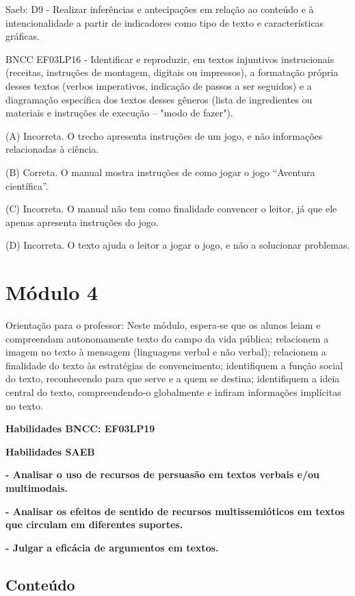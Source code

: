Saeb: D9 - Realizar inferências e antecipações em relação ao conteúdo e
à intencionalidade a partir de indicadores como tipo de texto e
características gráficas.

BNCC EF03LP16 - Identificar e reproduzir, em textos injuntivos
instrucionais (receitas, instruções de montagem, digitais ou impressos),
a formatação própria desses textos (verbos imperativos, indicação de
passos a ser seguidos) e a diagramação específica dos textos desses
gêneros (lista de ingredientes ou materiais e instruções de execução --
"modo de fazer").

(A) Incorreta. O trecho apresenta instruções de um jogo, e não
informações relacionadas à ciência.

(B) Correta. O manual mostra instruções de como jogar o jogo ``Aventura
científica''.

(C) Incorreta. O manual não tem como finalidade convencer o leitor, já
que ele apenas apresenta instruções do jogo.

(D) Incorreta. O texto ajuda o leitor a jogar o jogo, e não a solucionar
problemas.

\section{Módulo 4}\label{muxf3dulo-4}

Orientação para o professor: Neste módulo, espera-se que os alunos leiam
e compreendam autonomamente texto do campo da vida pública; relacionem a
imagem no texto à mensagem (linguagens verbal e não verbal); relacionem
a finalidade do texto às estratégias de convencimento; identifiquem a
função social do texto, reconhecendo para que serve e a quem se destina;
identifiquem a ideia central do texto, compreendendo-o globalmente e
infiram informações implícitas no texto.

\textbf{Habilidades BNCC: EF03LP19}

\textbf{Habilidades SAEB}

\textbf{- Analisar o uso de recursos de persuasão em textos verbais e/ou
multimodais.}

\textbf{- Analisar os efeitos de sentido de recursos multissemióticos em
textos que circulam em diferentes suportes.}

\textbf{- Julgar a eficácia de argumentos em textos.}

\subsection{Conteúdo}\label{conteuxfado-3}

